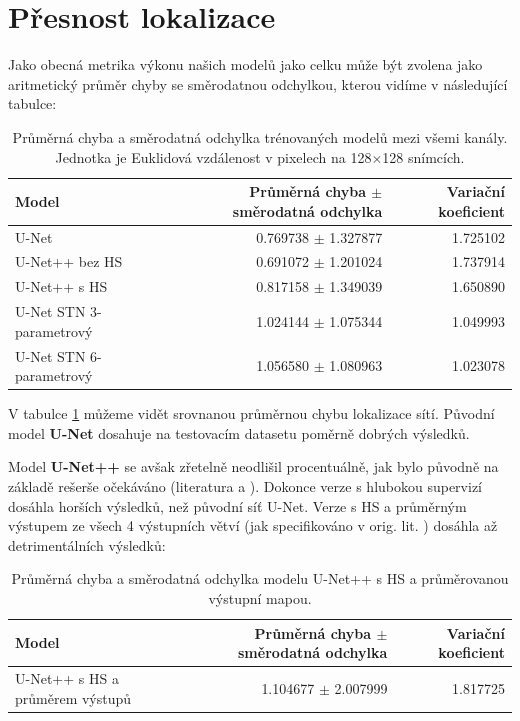 \section{Přesnost lokalizace}
\label{sec:Chapter62}

Jako obecná metrika výkonu našich modelů jako celku může být zvolena jako aritmetický průměr chyby se směrodatnou odchylkou, kterou vidíme v následující tabulce:
\begin{table}[H]
    \centering
    \begin{tabular}{lrr}
        \toprule
        Model & Průměrná chyba $\pm$ směrodatná odchylka & Variační koeficient \\
        \midrule
        U-Net & 0.769738 $\pm$ 1.327877 & 1.725102 \\
        U-Net++ bez HS & 0.691072 $\pm$ 1.201024 & 1.737914 \\
        U-Net++ s HS & 0.817158 $\pm$ 1.349039 & 1.650890 \\
        U-Net STN 3-parametrový & 1.024144 $\pm$ 1.075344 & 1.049993 \\
        U-Net STN 6-parametrový & 1.056580 $\pm$ 1.080963 & 1.023078 \\
        \bottomrule   
    \end{tabular}
    \caption[Průměrná chyba a směrodatná odchylka trénovaných modelů]{Průměrná chyba a směrodatná odchylka trénovaných modelů mezi všemi kanály. Jednotka je Euklidová vzdálenost v pixelech na 128$\times$128 snímcích.}
    \label{fig:mean_std_no_channel}
\end{table}

V tabulce \ref{fig:mean_std_no_channel} můžeme vidět srovnanou průměrnou chybu lokalizace sítí. Původní model \textbf{U-Net} dosahuje na testovacím datasetu poměrně dobrých výsledků. 

Model \textbf{U-Net++} se avšak zřetelně neodlišil procentuálně, jak bylo původně na základě rešerše očekáváno (literatura \cite{unetpp} a \cite{unet_comparison}). Dokonce verze s hlubokou supervizí dosáhla horších výsledků, než původní síť U-Net. Verze s HS a průměrným výstupem ze všech 4 výstupních větví (jak specifikováno v orig. lit. \cite{unetpp}) dosáhla až detrimentálních výsledků:
\begin{table}[H]
    \centering
    \begin{tabular}{lrr}
        \toprule
        Model & Průměrná chyba $\pm$ směrodatná odchylka & Variační koeficient \\
        \midrule
        U-Net++ s HS a průměrem výstupů & 1.104677 $\pm$ 2.007999 & 1.817725 \\
    \end{tabular}
    \caption[Průměrná chyba a směrodatná odchylka modelu původní sítě U-Net++ s HS]{Průměrná chyba a směrodatná odchylka modelu U-Net++ s HS a průměrovanou výstupní mapou.}
    \label{fig:mean_std_no_channel_unetpp_fail}
\end{table}

